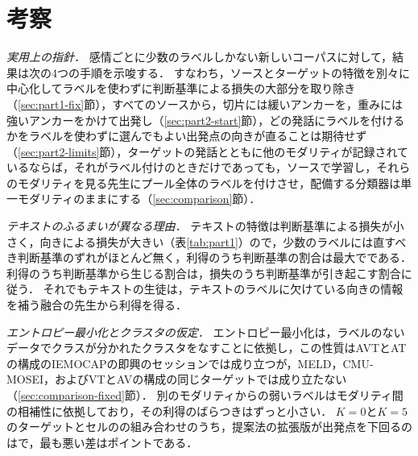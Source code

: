 \section{考察}
\label{sec:discussion}

\emph{実用上の指針．}
感情ごとに少数のラベルしかない新しいコーパスに対して，結果は次の4つの手順を示唆する．
すなわち，ソースとターゲットの特徴を別々に中心化してラベルを使わずに判断基準による損失の大部分を取り除き（\ref{sec:part1-fix}節），すべてのソースから，切片には緩いアンカーを，重みには強いアンカーをかけて出発し（\ref{sec:part2-start}節），どの発話にラベルを付けるかをラベルを使わずに選んでもよい出発点の向きが直ることは期待せず（\ref{sec:part2-limits}節），ターゲットの発話とともに他のモダリティが記録されているならば，それがラベル付けのときだけであっても，ソースで学習し，それらのモダリティを見る先生にプール全体のラベルを付けさせ，配備する分類器は単一モダリティのままにする（\ref{sec:comparison}節）．

\emph{テキストのふるまいが異なる理由．}
テキストの特徴は判断基準による損失が小さく，向きによる損失が大きい（表\ref{tab:part1}）ので，少数のラベルには直すべき判断基準のずれがほとんど無く，利得のうち判断基準の割合は最大でである．
利得のうち判断基準から生じる割合は，損失のうち判断基準が引き起こす割合に従う．
それでもテキストの生徒は，テキストのラベルに欠けている向きの情報を補う融合の先生から利得を得る．

\emph{エントロピー最小化とクラスタの仮定．}
エントロピー最小化は，ラベルのないデータでクラスが分かれたクラスタをなすことに依拠し，この性質はAVTとATの構成のIEMOCAPの即興のセッションでは成り立つが，MELD，CMU-MOSEI，およびVTとAVの構成の同じターゲットでは成り立たない（\ref{sec:comparison-fixed}節）．
別のモダリティからの弱いラベルはモダリティ間の相補性に依拠しており，その利得のばらつきはずっと小さい．
$K=0$と$K=5$のターゲットとセルのの組み合わせのうち，提案法の拡張版が出発点を下回るのはで，最も悪い差はポイントである．
